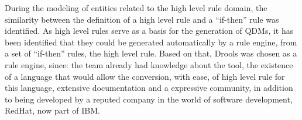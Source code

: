 During the modeling of entities related to the high level rule domain, the similarity between the definition of a high level rule and a ``if-then'' rule was identified. As high level rules serve as a basis for the generation of QDMs, it has been identified that they could be generated automatically by a rule engine, from a set of ``if-then'' rules, the high level rule. Based on that, Drools was chosen as a rule engine, since: the team already had knowledge about the tool, the existence of a language that would allow the conversion, with ease, of high level rule for this language, extensive documentation and a expressive community, in addition to being developed by a reputed company in the world of software development, RedHat, now part of IBM.


